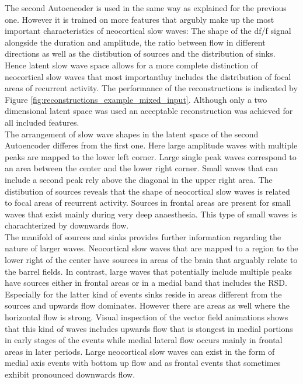 The second Autoencoder is used in the same way as explained for the previous one. However it is trained on more features that argubly make up the most important characteristics of neocortical slow waves: The shape of the df/f signal alongside the duration and amplitude, the ratio between flow in different directions as well as the distibution of sources and the distribution of sinks. Hence latent slow wave space allows for a more complete distinction of neocortical slow waves that most importantluy includes the distribution of focal areas of recurrent activity. The performance of the reconstructions is indicated by Figure \ref{fig:reconstructions_example_mixed_input}. Although only a two dimensional latent space was used an acceptable reconstruction was achieved for all included features.\\
The arrangement of slow wave shapes in the latent space of the second Autoencoder differes from the first one. Here large amplitude waves with multiple peaks are mapped to the lower left corner. Large single peak waves correspond to an area between the center and the lower right corner. Small waves that can include a second peak rely above the diagonal in the upper right area. The distibution of sources reveals that the shape of neocortical slow waves is related to focal areas of recurrent activity. Sources in frontal areas are present for small waves that exist mainly during very deep anaesthesia. This type of small waves is charachterized by downwards flow.\\
The manifold of sources and sinks provides further information regarding the nature of larger waves. Neocortical slow waves that are mapped to a region to the lower right of the center have sources in areas of the brain that arguably relate to the barrel fields. In contrast, large waves that potentially include multiple peaks have sources either in frontal areas or in a medial band that includes the RSD. Especially for the latter kind of events sinks reside in areas different from the sources and upwards flow dominates. However there are areas as well where the horizontal flow is strong. Visual inspection of the vector field animations shows that this kind of waves includes upwards flow that is stongest in medial portions in early stages of the events while medial lateral flow occurs mainly in frontal areas in later periods. Large neocortical slow waves can exist in the form of medial axis events with bottom up flow and as frontal events that sometimes exhibit pronounced downwards flow. \\
